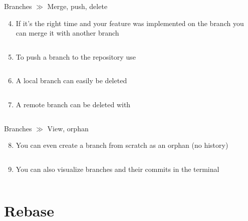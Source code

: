 \documentclass[10pt]{beamer}
\begin{document}
\begin{frame}{Branches $\gg$ Merge, push, delete}
\begin{center}
	\begin{enumerate}\setcounter{enumi}{3}
		\item If it's the right time and your feature was implemented on the branch you can merge it with another branch
		\inputminted[bgcolor=lightGreyCustom,fontsize=\scriptsize]{sh}{./resources/git_branches_04_merge.sh}
		\item To push a branch to the repository use
		\inputminted[bgcolor=lightGreyCustom,fontsize=\scriptsize]{sh}{./resources/git_branches_05_push.sh}
		\item A local branch can easily be deleted
		\inputminted[bgcolor=lightGreyCustom,fontsize=\scriptsize]{sh}{./resources/git_branches_06_delete.sh}
		\item A remote branch can be deleted with
		\inputminted[bgcolor=lightGreyCustom,fontsize=\scriptsize]{sh}{./resources/git_branches_07_delete_remote.sh}
	\end{enumerate}
\end{center}
\end{frame}

\begin{frame}{Branches $\gg$ View, orphan}
\begin{center}
	\begin{enumerate}\setcounter{enumi}{7}
		\item You can even create a branch from scratch as an orphan (no history)
		\inputminted[bgcolor=lightGreyCustom,fontsize=\scriptsize]{sh}{./resources/git_branches_08_orphan.sh}
		\item You can also visualize branches and their commits in the terminal
		\inputminted[bgcolor=lightGreyCustom,fontsize=\scriptsize]{sh}{./resources/git_branches_09_log.sh}
	\end{enumerate}
\end{center}
\end{frame}

\section{Rebase}
\end{document}
